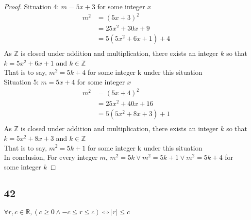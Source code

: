 \documentclass{article}
\begin{document}
\begin{proof}
Situation 4: $m = 5x +3$ for some integer $x$\\
\begin{align*}
    m^2 &= (5x + 3)^2\\
    &= 25x^2 + 30x + 9\\
    &= 5(5x^2 + 6x +1) + 4\\
\end{align*}
As $\mathbb{Z}$ is closed under addition and multiplication, there exists an integer $k$ so that $k = 5x^2 + 6x +1$ and $k \in \mathbb{Z}$\\
That is to say, $m^2 = 5k + 4$ for some integer k under this situation\\

Situation 5: $m = 5x + 4$ for some integer $x$\\
\begin{align*}
    m^2 &= (5x + 4)^2\\
    &= 25x^2 + 40x + 16\\
    &= 5(5x^2 + 8x +3) + 1\\
\end{align*}
As $\mathbb{Z}$ is closed under addition and multiplication, there exists an integer $k$ so that $k = 5x^2 + 8x +3$ and $k \in \mathbb{Z}$\\
That is to say, $m^2 = 5k + 1$ for some integer k under this situation\\

In conclusion, For every integer $m$, $m^2 = 5k \vee m^2 = 5k+1 \vee m^2 = 5k +4$ for some integer $k$
\end{proof}

\subsection{42}
$\forall r,c \in \mathbb{R}, (c \geq 0 \wedge -c \leq r \leq c) \iff |r| \leq c$
\end{document}
